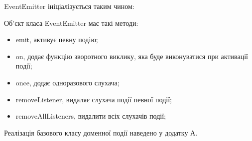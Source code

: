 EventEmitter ініціалізується таким чином:


Об'єкт класа EventEmitter має такі методи:

\begin{itemize}
    \item emit, активує певну подію;
    \item on, додає функцію зворотного виклику,
        яка буде виконуватися при активації події;
    \item once, додає одноразового слухача;
    \item removeListener, видаляє слухача події певної події;
    \item removeAllListeners, видалити всіх слухачів події;
\end{itemize}

Реалізація базового класу доменної події наведено у додатку А.

